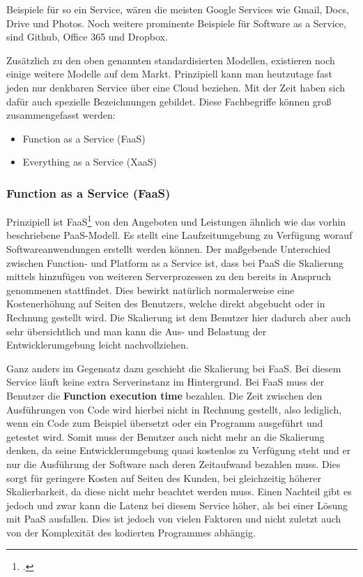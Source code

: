 Beispiele für so ein Service, wären die meisten Google Services wie Gmail, Docs, Drive und Photos. Noch weitere prominente Beispiele für Software as a Service, sind Github, Office 365 und Dropbox.

Zusätzlich zu den oben genannten standardisierten Modellen, existieren noch einige weitere Modelle auf dem Markt. Prinzipiell
kann man heutzutage fast jeden nur denkbaren Service über eine Cloud beziehen. Mit der Zeit haben sich dafür auch spezielle Bezeichnungen gebildet. Diese Fachbegriffe können groß zusammengefasst werden:
\begin{itemize}
	\item Function as a Service (FaaS)
	\item Everything as a Service (XaaS)
\end{itemize}

\subsubsection{Function as a Service (FaaS)}
Prinzipiell ist FaaS\footcite{cloud-ms} von den Angeboten und Leistungen ähnlich wie das vorhin beschriebene PaaS-Modell. Es stellt eine Laufzeitumgebung zu Verfügung worauf Softwareanwendungen erstellt werden können. Der maßgebende Unterschied zwischen Function- und Platform as a Service ist, dass bei PaaS die Skalierung mittels hinzufügen von weiteren Serverprozessen zu den bereits in Anspruch genommenen stattfindet. Dies bewirkt natürlich normalerweise eine Kostenerhöhung auf Seiten des Benutzers, welche direkt abgebucht oder in Rechnung gestellt wird. Die Skalierung ist dem Benutzer hier dadurch aber auch sehr übersichtlich und man kann die Aus- und Belastung der Entwicklerumgebung leicht nachvollziehen.\newline

Ganz anders im Gegensatz dazu geschieht die Skalierung bei FaaS. Bei diesem Service läuft keine extra Serverinstanz im Hintergrund. Bei FaaS muss der Benutzer die \textbf{Function execution time} bezahlen. Die Zeit zwischen den Ausführungen von Code wird hierbei nicht in Rechnung gestellt, also lediglich, wenn ein Code zum Beispiel übersetzt oder ein Programm ausgeführt und getestet wird. Somit muss der Benutzer auch nicht mehr an die Skalierung denken, da seine Entwicklerumgebung quasi kostenlos zu Verfügung steht und er nur die Ausführung der Software nach deren Zeitaufwand bezahlen muss.
Dies sorgt für geringere Kosten auf Seiten des Kunden, bei gleichzeitig höherer Skalierbarkeit, da diese nicht mehr beachtet werden muss. Einen Nachteil gibt es jedoch und zwar kann die Latenz bei diesem Service höher, als bei einer Lösung mit PaaS ausfallen. Dies ist jedoch von vielen Faktoren und nicht zuletzt auch von der Komplexität des kodierten Programmes abhängig.

